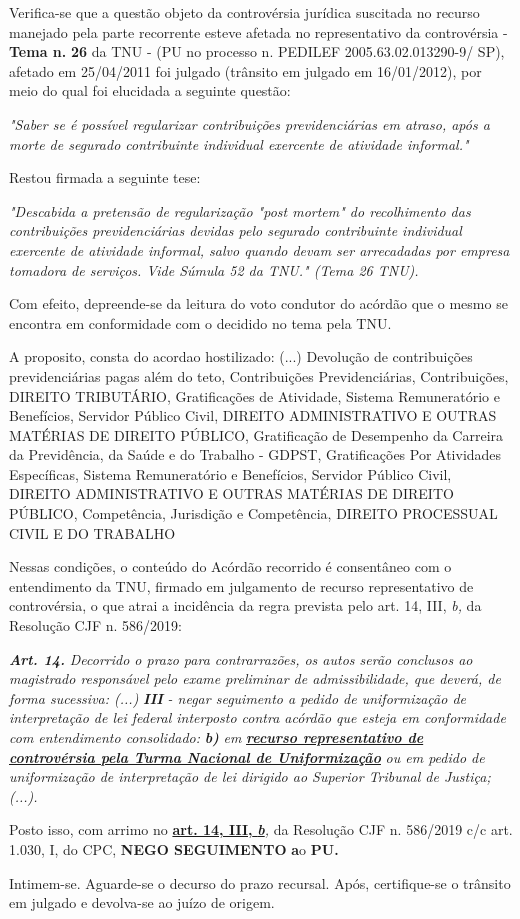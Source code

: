 \documentclass[12pt]{article}
\begin{document}
\justifying
\noindent Verifica-se que a questão objeto da controvérsia jurídica suscitada no recurso manejado pela parte recorrente esteve afetada no representativo da controvérsia - \textbf{Tema n. }\textbf{26} da TNU - (PU no processo n. PEDILEF 2005.63.02.013290-9/ SP),  afetado em 25/04/2011 foi julgado (trânsito em julgado em 16/01/2012), por meio do qual foi elucidada a seguinte questão:

\noindent \textit{"Saber se é possível regularizar contribuições previdenciárias em atraso, após a morte de segurado contribuinte individual exercente de atividade informal."}

\noindent Restou firmada a seguinte tese:

\noindent \textit{"Descabida a pretensão de regularização "post mortem" do recolhimento das contribuições previdenciárias devidas pelo segurado contribuinte individual exercente de atividade informal, salvo quando devam ser arrecadadas por empresa tomadora de serviços. Vide Súmula 52 da TNU." (Tema 26 TNU).}

\noindent Com efeito, depreende-se da leitura do voto condutor do acórdão que o mesmo se encontra em conformidade com o decidido no  tema pela TNU.

\noindent A proposito, consta do acordao hostilizado: (...) Devolução de contribuições previdenciárias pagas além do teto, Contribuições Previdenciárias, Contribuições, DIREITO TRIBUTÁRIO, Gratificações de Atividade, Sistema Remuneratório e Benefícios, Servidor Público Civil, DIREITO ADMINISTRATIVO E OUTRAS MATÉRIAS DE DIREITO PÚBLICO, Gratificação de Desempenho da Carreira da Previdência, da Saúde e do Trabalho - GDPST, Gratificações Por Atividades Específicas, Sistema Remuneratório e Benefícios, Servidor Público Civil, DIREITO ADMINISTRATIVO E OUTRAS MATÉRIAS DE DIREITO PÚBLICO, Competência, Jurisdição e Competência, DIREITO PROCESSUAL CIVIL E DO TRABALHO

\noindent Nessas condições, o conteúdo do Acórdão recorrido é consentâneo com o entendimento da TNU, firmado em julgamento de recurso representativo de controvérsia, o que atrai a incidência da regra prevista pelo art. 14, III, \textit{b,} da Resolução CJF n. 586/2019:

\noindent \textit{\textbf{Art. 14.}}\textit{ Decorrido o prazo para contrarrazões, os autos serão conclusos ao magistrado responsável pelo exame preliminar de admissibilidade, que deverá, de forma sucessiva: (...) }\textit{\textbf{III }}\textit{- negar seguimento a pedido de uniformização de interpretação de lei federal interposto contra acórdão que esteja em conformidade com entendimento consolidado: }\textit{\textbf{b)}}\textit{ em }\uline{\textit{\textbf{recurso representativo de controvérsia pela Turma Nacional de Uniformização}}}\textit{ ou em pedido de uniformização de interpretação de lei dirigido ao Superior Tribunal de Justiça;(...).}

\noindent Posto isso, com arrimo no \uline{\textbf{art. 14, III, }}\uline{\textit{\textbf{b}}}\textit{,} da Resolução CJF n. 586/2019 c/c art. 1.030, I, do CPC, \textbf{NEGO SEGUIMENTO }\textbf{a}o\textbf{ PU}\textbf{.}

\noindent Intimem-se. Aguarde-se o decurso do prazo recursal. Após, certifique-se o trânsito em julgado e devolva-se ao juízo de origem.
\end{document}
